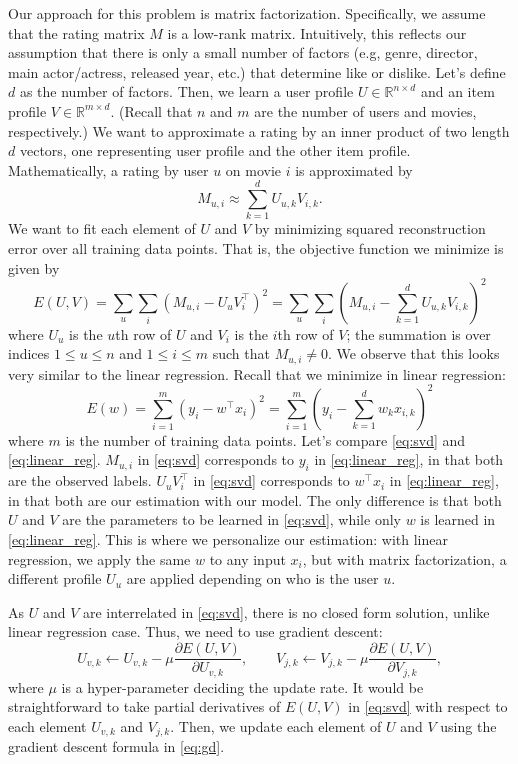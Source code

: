\documentclass[12pt]{article}
\begin{document}
Our approach for this problem is matrix factorization. Specifically,
we assume that the rating matrix $M$ is a low-rank matrix.
Intuitively, this reflects our assumption that there is only a small
number of factors (e.g, genre, director, main actor/actress,
released year, etc.) that determine like or dislike. Let's define
$d$ as the number of factors. Then, we learn a user profile $U \in
\mathbb{R}^{n \times d}$ and an item profile $V \in \mathbb{R}^{m
\times d}$. (Recall that $n$ and $m$ are the number of users and
movies, respectively.) We want to approximate a rating by an inner
product of two length $d$ vectors, one representing user profile and
the other item profile. Mathematically, a rating by user $u$ on
movie $i$ is approximated by
\begin{equation}
M_{u,i} \approx \sum_{k=1}^d U_{u,k} V_{i,k}.
\end{equation}
We want to fit each element of $U$ and $V$ by minimizing squared
reconstruction error over all training data points. That is, the
objective function we minimize is given by
\begin{equation}
E(U,V) = \sum_{u}\sum_{i} (M_{u,i} - U_u V_i^\top)^2 = \sum_{u}\sum_{i}  (M_{u,i} - \sum_{k=1}^d U_{u,k} V_{i,k})^2 \label{eq:svd}
\end{equation}
where $U_u$ is the $u$th row of $U$ and $V_i$ is the $i$th row of
$V$; the summation is over indices $1\leq u\leq n$ and $1\leq i\leq m$ such that $M_{u,i}\neq 0$. We observe that this looks very similar to the linear
regression. Recall that we minimize in linear regression:
\begin{equation}
E(w) = \sum_{i=1}^m (y_i - w^\top x_i)^2 = \sum_{i=1}^m (y_i
- \sum_{k=1}^d w_k x_{i,k})^2 \label{eq:linear_reg}
\end{equation}
where $m$ is the number of training data points. Let's compare
\eqref{eq:svd} and \eqref{eq:linear_reg}. $M_{u,i}$ in
\eqref{eq:svd} corresponds to $y_i$ in \eqref{eq:linear_reg}, in
that both are the observed labels. $U_u V_i^\top$ in \eqref{eq:svd}
corresponds to $w^\top x_i$ in \eqref{eq:linear_reg}, in that both
are our estimation with our model. The only difference is that both
$U$ and $V$ are the parameters to be learned in \eqref{eq:svd},
while only $w$ is learned in \eqref{eq:linear_reg}. This is
where we personalize our estimation: with linear regression, we
apply the same $w$ to any input $x_i$, but with matrix
factorization, a different profile $U_u$ are applied depending on
who is the user $u$.

As $U$ and $V$ are interrelated in \eqref{eq:svd}, there is no
closed form solution, unlike linear regression case. Thus, we need
to use gradient descent:
\begin{equation}
U_{v,k} \gets U_{v,k} - \mu \frac{\partial E(U, V)}{\partial
U_{v,k}}, \quad \quad V_{j,k} \gets V_{j,k} - \mu \frac{\partial
E(U, V)}{\partial V_{j,k}},\label{eq:gd}
\end{equation}
where $\mu$ is a hyper-parameter deciding the update rate. It would
be straightforward to take partial derivatives of $E(U,V)$ in
\eqref{eq:svd} with respect to each element $U_{v,k}$ and $V_{j,k}$.
Then, we update each element of $U$ and $V$ using the gradient
descent formula in \eqref{eq:gd}.
\end{document}
